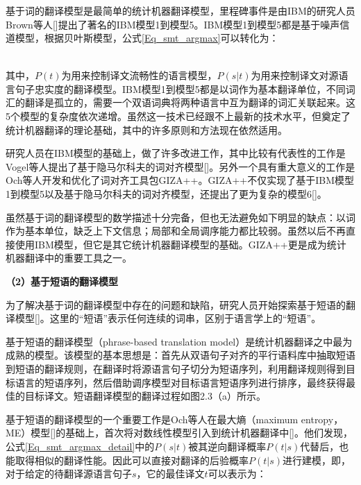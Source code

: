 基于词的翻译模型是最简单的统计机器翻译模型，里程碑事件是由IBM的研究人员Brown等人[\cite{Brown:1990,Brown:1993}]提出了著名的IBM模型1到模型5。IBM模型1到模型5都是基于噪声信道模型，根据贝叶斯模型，公式\ref{Eq_smt_argmax}可以转化为：

\begin{equation}
\label{Eq_smt_argmax_detail}
\begin{split}
\end{split}
\end{equation}

其中，$P(t)$为用来控制译文流畅性的语言模型，$P(s|t)$为用来控制译文对源语言句子忠实度的翻译模型。IBM模型1到模型5都是以词作为基本翻译单位，不同词汇的翻译是孤立的，需要一个双语词典将两种语言中互为翻译的词汇关联起来。这5个模型的复杂度依次递增。虽然这一技术已经跟不上最新的技术水平，但奠定了统计机器翻译的理论基础，其中的许多原则和方法现在依然适用。

研究人员在IBM模型的基础上，做了许多改进工作，其中比较有代表性的工作是Vogel等人提出了基于隐马尔科夫的词对齐模型[\cite{Vogel:1996}]。另外一个具有重大意义的工作是Och等人开发和优化了词对齐工具包GIZA++。GIZA++不仅实现了基于IBM模型1到模型5以及基于隐马尔科夫的词对齐模型，还提出了更为复杂的模型6[\cite{Och:2003b}]。

虽然基于词的翻译模型的数学描述十分完备，但也无法避免如下明显的缺点：以词作为基本单位，缺乏上下文信息；局部和全局调序能力都比较弱。虽然以后不再直接使用IBM模型，但它是其它统计机器翻译模型的基础。GIZA++更是成为统计机器翻译中的重要工具之一。

\textbf{（2）基于短语的翻译模型}

为了解决基于词的翻译模型中存在的问题和缺陷，研究人员开始探索基于短语的翻译模型[\cite{Wang:1998,Och:1999,Och:2002,Koehn:2003,Koehn:2004a,Koehn:2007}]。这里的“短语”表示任何连续的词串，区别于语言学上的“短语”。

基于短语的翻译模型（phrase-based translation model）是统计机器翻译之中最为成熟的模型。该模型的基本思想是：首先从双语句子对齐的平行语料库中抽取短语到短语的翻译规则，在翻译时将源语言句子切分为短语序列，利用翻译规则得到目标语言的短语序列，然后借助调序模型对目标语言短语序列进行排序，最终获得最佳的目标译文。短语翻译模型的翻译过程如图2.3（a）所示。

基于短语的翻译模型的一个重要工作是Och等人在最大熵（maximum entropy，ME）模型[\cite{Berger:1996}]的基础上，首次将对数线性模型引入到统计机器翻译中[\cite{Och:2002}]。他们发现，公式\ref{Eq_smt_argmax_detail}中的$P(s|t)$被其逆向翻译概率$P(t|s)$代替后，也能取得相似的翻译性能。因此可以直接对翻译的后验概率$P(t|s)$进行建模，即，对于给定的待翻译源语言句子$s$，它的最佳译文$t$可以表示为：

